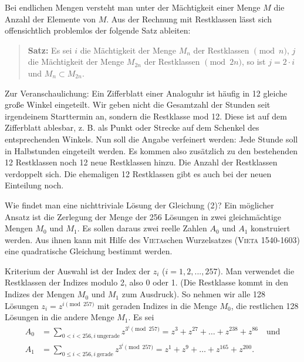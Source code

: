 \documentclass[11pt]{article}
\begin{document}
Bei endlichen Mengen versteht man unter der Mächtigkeit einer Menge $M$ die
Anzahl der Elemente von $M$. Aus der Rechnung mit Restklassen lässt sich
offensichtlich problemlos der folgende Satz ableiten:
\begin{quote}
  \textbf{Satz:} Es sei $i$ die Mächtigkeit der Menge $M_n$ der Restklassen
  $\pmod{n}$, $j$ die Mächtigkeit der Menge $M_{2n}$ der Restklassen
  $\pmod{2n}$, so ist $j = 2 \cdot i$ und $M_n \subset M_{2n}$.
\end{quote}
Zur Veranschaulichung: Ein Zifferblatt einer Analoguhr ist häufig in 12
gleiche große Winkel eingeteilt. Wir geben nicht die Gesamtzahl der Stunden
seit irgendeinem Starttermin an, sondern die Restklasse mod 12. Diese ist auf
dem Zifferblatt ablesbar, z. B. als Punkt oder Strecke auf dem Schenkel des
entsprechenden Winkels. Nun soll die Angabe verfeinert werden: Jede Stunde
soll in Halbstunden eingeteilt werden. Es kommen also zusätzlich zu den
bestehenden 12 Restklassen noch 12 neue Restklassen hinzu. Die Anzahl der
Restklassen verdoppelt sich. Die ehemaligen 12 Restklassen gibt es auch bei
der neuen Einteilung noch.

Wie findet man eine nichttriviale Lösung der Gleichung (2)?  Ein möglicher
Ansatz ist die Zerlegung der Menge der 256 Lösungen in zwei gleichmächtige
Mengen $M_0$ und $M_1$. Es sollen daraus zwei reelle Zahlen $A_0$ und $A_1$
konstruiert werden. Aus ihnen kann mit Hilfe des \textsc{Vieta}schen
Wurzelsatzes (\textsc{Vieta} 1540-1603) eine quadratische Gleichung bestimmt
werden.

Kriterium der Auswahl ist der Index der $z_i$ ($i = 1, 2, ..., 257$). Man
verwendet die Restklassen der Indizes modulo 2, also 0 oder 1. (Die Restklasse
kommt in den Indizes der Mengen $M_0$ und $M_1$ zum Ausdruck). So nehmen wir
alle 128 Lösungen $z_i = z^{i \pmod{257}}$ mit geraden Indizes in die Menge
$M_0$, die restlichen 128 Lösungen in die andere Menge $M_1$. Es sei 
\begin{align*}
  A_0&= \sum_{0<i<256, i\ \text{ungerade}}{z^{3^i \pmod{257}}}
  =z^3+z^{27}+\ldots+z^{238}+z^{86} \quad \text{und}\\
  A_1 &= \sum_{0\le i <256, i\ \text{gerade}}{z^{3^i \pmod{257}}} =
  z^1+z^9+\ldots+z^{165}+z^{200}.
\end{align*}
\end{document}
